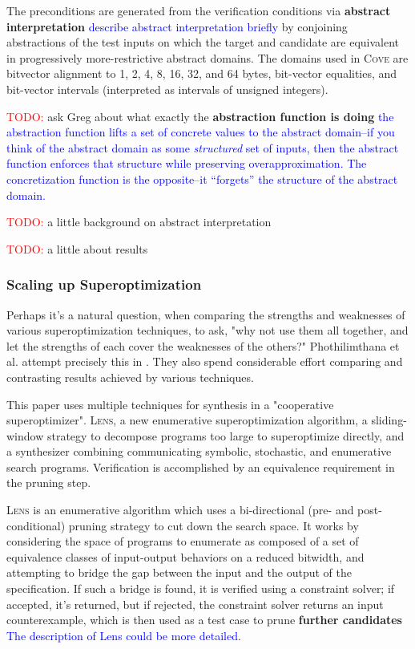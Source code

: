 \documentclass[12pt,twoside]{reedthesis}
\newcommand{\red}[1]{\textcolor{red}{#1}}
\newcommand{\comment}[2]{\textbf{#1} \textcolor{blue}{#2}}
\begin{document}
        The preconditions are generated from the verification conditions via
            \comment{abstract interpretation}{describe abstract interpretation briefly}
            by conjoining abstractions of the test inputs on which the target and candidate are equivalent in progressively more-restrictive abstract domains.
        The domains used in \textsc{Cove} are bitvector alignment to 1, 2, 4, 8, 16, 32, and 64 bytes, bit-vector equalities, and bit-vector intervals (interpreted as intervals of unsigned integers).
            
        \red{TODO:} ask Greg about what exactly the \comment{abstraction function is doing}{the abstraction function lifts a set of concrete values to the abstract domain--if you think of the abstract domain as some \emph{structured} set of inputs, then the abstract function enforces that structure while preserving overapproximation. The concretization function is the opposite--it ``forgets'' the structure of the abstract domain.}
            
        \red{TODO:} a little background on abstract interpretation
            
        \red{TODO:} a little about results

    \subsubsection{Scaling up Superoptimization}
        Perhaps it's a natural question, when comparing the strengths and weaknesses of various superoptimization techniques, to ask, "why not use them all together, and let the strengths of each cover the weaknesses of the others?"
        Phothilimthana et al. attempt precisely this in \cite{phothilimthana2016scaling}.
        They also spend considerable effort comparing and contrasting results achieved by various techniques.
            
        This paper uses multiple techniques for synthesis in a "cooperative superoptimizer".
        \textsc{Lens}, a new enumerative superoptimization algorithm,
        a sliding-window strategy to decompose programs too large to superoptimize directly,
        and a synthesizer combining communicating symbolic, stochastic, and enumerative search programs.
        Verification is accomplished by an equivalence requirement in the pruning step.
            
        \textsc{Lens} is an enumerative algorithm which uses a bi-directional (pre- and post-conditional) pruning strategy to cut down the search space.
        It works by considering the space of programs to enumerate as composed of a set of equivalence classes of input-output behaviors on a reduced bitwidth, and attempting to bridge the gap between the input and the output of the specification.
        If such a bridge is found, it is verified using a constraint solver;
                if accepted, it's returned,
                but if rejected, the constraint solver returns an input counterexample,
            which is then used as a test case to prune \comment{further candidates}{The description of Lens could be more detailed}.
\end{document}

